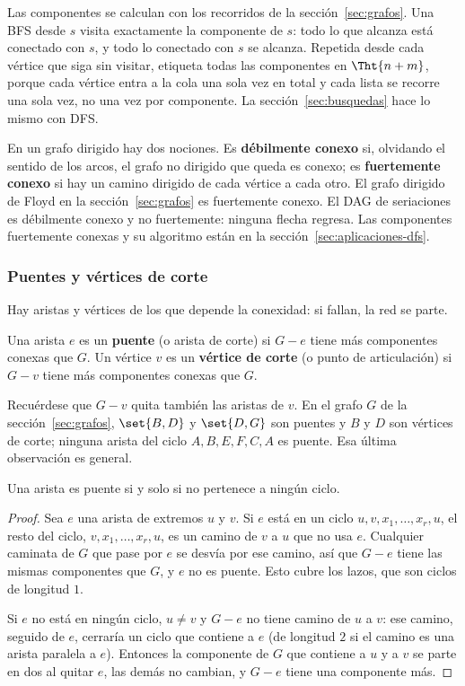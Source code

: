 \documentclass[11pt,letterpaper]{article}
\begin{document}
Las componentes se calculan con los recorridos de la
sección~\ref{sec:grafos}. Una BFS desde $s$ visita exactamente la
componente de $s$: todo lo que alcanza está conectado con $s$, y todo
lo conectado con $s$ se alcanza. Repetida desde cada vértice que siga
sin visitar, etiqueta todas las componentes en $\Tht{n + m}$, porque
cada vértice entra a la cola una sola vez en total y cada lista se
recorre una sola vez, no una vez por componente. La
sección~\ref{sec:busquedas} hace lo mismo con DFS.

En un grafo dirigido hay dos nociones. Es \textbf{débilmente conexo}
si, olvidando el sentido de los arcos, el grafo no dirigido que queda
es conexo; es \textbf{fuertemente conexo} si hay un camino dirigido de
cada vértice a cada otro. El grafo dirigido de Floyd en la
sección~\ref{sec:grafos} es fuertemente conexo. El DAG de seriaciones
es débilmente conexo y no fuertemente: ninguna flecha regresa. Las
componentes fuertemente conexas y su algoritmo están en la
sección~\ref{sec:aplicaciones-dfs}.

\subsubsection*{Puentes y vértices de corte}

Hay aristas y vértices de los que depende la conexidad: si fallan, la
red se parte.

\begin{definicion}
  \label{def:puente-corte}
  Una arista $e$ es un \textbf{puente} (o arista de corte) si $G - e$
  tiene más componentes conexas que $G$. Un vértice $v$ es un
  \textbf{vértice de corte} (o punto de articulación) si $G - v$ tiene
  más componentes conexas que $G$.
\end{definicion}

Recuérdese que $G - v$ quita también las aristas de $v$. En el grafo
$G$ de la sección~\ref{sec:grafos}, $\set{B, D}$ y $\set{D, G}$ son
puentes y $B$ y $D$ son vértices de corte; ninguna arista del ciclo
$A, B, E, F, C, A$ es puente. Esa última observación es general.

\begin{teorema}
  \label{teo:puente-ciclo}
  Una arista es puente si y solo si no pertenece a ningún ciclo.
\end{teorema}

\begin{proof}
  Sea $e$ una arista de extremos $u$ y $v$. Si $e$ está en un ciclo
  $u, v, x_1, \dots, x_r, u$, el resto del ciclo,
  $v, x_1, \dots, x_r, u$, es un camino de $v$ a $u$ que no usa $e$.
  Cualquier caminata de $G$ que pase por $e$ se desvía por ese camino,
  así que $G - e$ tiene las mismas componentes que $G$, y $e$ no es
  puente. Esto cubre los lazos, que son ciclos de longitud $1$.

  Si $e$ no está en ningún ciclo, $u \neq v$ y $G - e$ no tiene camino
  de $u$ a $v$: ese camino, seguido de $e$, cerraría un ciclo que
  contiene a $e$ (de longitud $2$ si el camino es una arista paralela a
  $e$). Entonces la componente de $G$ que contiene a $u$ y a $v$ se
  parte en dos al quitar $e$, las demás no cambian, y $G - e$ tiene una
  componente más.
\end{proof}
\end{document}

